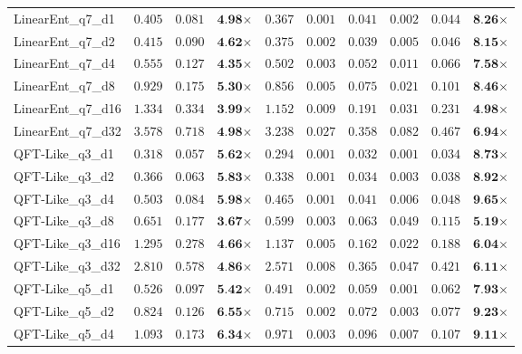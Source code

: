 \begin{table*}[t]
{\begin{tabular}{| l || r r c || r r r r r c |}
LinearEnt\_q7\_d1 & $0.405$ & $0.081$ & $\textbf{4.98}$$\times$ & $0.367$ & $0.001$ & $0.041$ & $0.002$ & $0.044$ & $\textbf{8.26}$$\times$ \\
LinearEnt\_q7\_d2 & $0.415$ & $0.090$ & $\textbf{4.62}$$\times$ & $0.375$ & $0.002$ & $0.039$ & $0.005$ & $0.046$ & $\textbf{8.15}$$\times$ \\
LinearEnt\_q7\_d4 & $0.555$ & $0.127$ & $\textbf{4.35}$$\times$ & $0.502$ & $0.003$ & $0.052$ & $0.011$ & $0.066$ & $\textbf{7.58}$$\times$ \\
LinearEnt\_q7\_d8 & $0.929$ & $0.175$ & $\textbf{5.30}$$\times$ & $0.856$ & $0.005$ & $0.075$ & $0.021$ & $0.101$ & $\textbf{8.46}$$\times$ \\
LinearEnt\_q7\_d16 & $1.334$ & $0.334$ & $\textbf{3.99}$$\times$ & $1.152$ & $0.009$ & $0.191$ & $0.031$ & $0.231$ & $\textbf{4.98}$$\times$ \\
LinearEnt\_q7\_d32 & $3.578$ & $0.718$ & $\textbf{4.98}$$\times$ & $3.238$ & $0.027$ & $0.358$ & $0.082$ & $0.467$ & $\textbf{6.94}$$\times$ \\
QFT-Like\_q3\_d1 & $0.318$ & $0.057$ & $\textbf{5.62}$$\times$ & $0.294$ & $0.001$ & $0.032$ & $0.001$ & $0.034$ & $\textbf{8.73}$$\times$ \\
QFT-Like\_q3\_d2 & $0.366$ & $0.063$ & $\textbf{5.83}$$\times$ & $0.338$ & $0.001$ & $0.034$ & $0.003$ & $0.038$ & $\textbf{8.92}$$\times$ \\
QFT-Like\_q3\_d4 & $0.503$ & $0.084$ & $\textbf{5.98}$$\times$ & $0.465$ & $0.001$ & $0.041$ & $0.006$ & $0.048$ & $\textbf{9.65}$$\times$ \\
QFT-Like\_q3\_d8 & $0.651$ & $0.177$ & $\textbf{3.67}$$\times$ & $0.599$ & $0.003$ & $0.063$ & $0.049$ & $0.115$ & $\textbf{5.19}$$\times$ \\
QFT-Like\_q3\_d16 & $1.295$ & $0.278$ & $\textbf{4.66}$$\times$ & $1.137$ & $0.005$ & $0.162$ & $0.022$ & $0.188$ & $\textbf{6.04}$$\times$ \\
QFT-Like\_q3\_d32 & $2.810$ & $0.578$ & $\textbf{4.86}$$\times$ & $2.571$ & $0.008$ & $0.365$ & $0.047$ & $0.421$ & $\textbf{6.11}$$\times$ \\
QFT-Like\_q5\_d1 & $0.526$ & $0.097$ & $\textbf{5.42}$$\times$ & $0.491$ & $0.002$ & $0.059$ & $0.001$ & $0.062$ & $\textbf{7.93}$$\times$ \\
QFT-Like\_q5\_d2 & $0.824$ & $0.126$ & $\textbf{6.55}$$\times$ & $0.715$ & $0.002$ & $0.072$ & $0.003$ & $0.077$ & $\textbf{9.23}$$\times$ \\
QFT-Like\_q5\_d4 & $1.093$ & $0.173$ & $\textbf{6.34}$$\times$ & $0.971$ & $0.003$ & $0.096$ & $0.007$ & $0.107$ & $\textbf{9.11}$$\times$ \\

\end{tabular}}
\end{table*}
